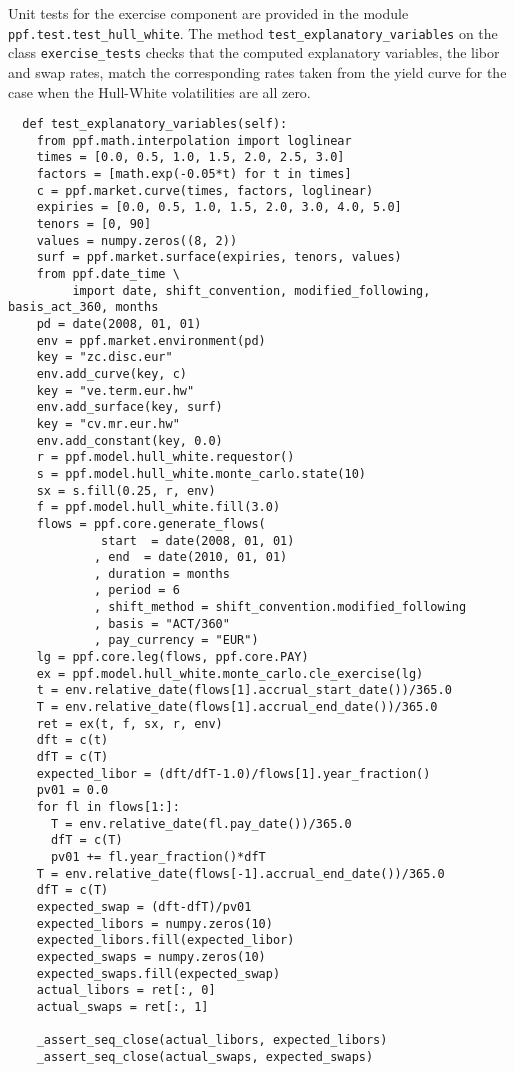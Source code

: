 Unit tests for the exercise component are provided in the module
\verb|ppf.test.test_hull_white|. The method
\verb|test_explanatory_variables| on the class \verb|exercise_tests|
checks that the computed explanatory variables, the libor and swap
rates, match the corresponding rates taken from the yield curve for
the case when the Hull-White volatilities are all zero.
\begin{verbatim}
  def test_explanatory_variables(self):
    from ppf.math.interpolation import loglinear
    times = [0.0, 0.5, 1.0, 1.5, 2.0, 2.5, 3.0]
    factors = [math.exp(-0.05*t) for t in times]
    c = ppf.market.curve(times, factors, loglinear)
    expiries = [0.0, 0.5, 1.0, 1.5, 2.0, 3.0, 4.0, 5.0]
    tenors = [0, 90]
    values = numpy.zeros((8, 2))
    surf = ppf.market.surface(expiries, tenors, values)
    from ppf.date_time \
         import date, shift_convention, modified_following, basis_act_360, months
    pd = date(2008, 01, 01)
    env = ppf.market.environment(pd)
    key = "zc.disc.eur"
    env.add_curve(key, c)
    key = "ve.term.eur.hw"
    env.add_surface(key, surf)
    key = "cv.mr.eur.hw"
    env.add_constant(key, 0.0)
    r = ppf.model.hull_white.requestor()
    s = ppf.model.hull_white.monte_carlo.state(10)
    sx = s.fill(0.25, r, env)
    f = ppf.model.hull_white.fill(3.0)
    flows = ppf.core.generate_flows(
             start  = date(2008, 01, 01)
            , end  = date(2010, 01, 01)
            , duration = months
            , period = 6
            , shift_method = shift_convention.modified_following
            , basis = "ACT/360"
            , pay_currency = "EUR")
    lg = ppf.core.leg(flows, ppf.core.PAY)
    ex = ppf.model.hull_white.monte_carlo.cle_exercise(lg)
    t = env.relative_date(flows[1].accrual_start_date())/365.0
    T = env.relative_date(flows[1].accrual_end_date())/365.0
    ret = ex(t, f, sx, r, env)
    dft = c(t)
    dfT = c(T)
    expected_libor = (dft/dfT-1.0)/flows[1].year_fraction()
    pv01 = 0.0
    for fl in flows[1:]:
      T = env.relative_date(fl.pay_date())/365.0
      dfT = c(T)
      pv01 += fl.year_fraction()*dfT
    T = env.relative_date(flows[-1].accrual_end_date())/365.0
    dfT = c(T)
    expected_swap = (dft-dfT)/pv01
    expected_libors = numpy.zeros(10)
    expected_libors.fill(expected_libor)
    expected_swaps = numpy.zeros(10)
    expected_swaps.fill(expected_swap)
    actual_libors = ret[:, 0]
    actual_swaps = ret[:, 1]

    _assert_seq_close(actual_libors, expected_libors)
    _assert_seq_close(actual_swaps, expected_swaps)
\end{verbatim}
 
